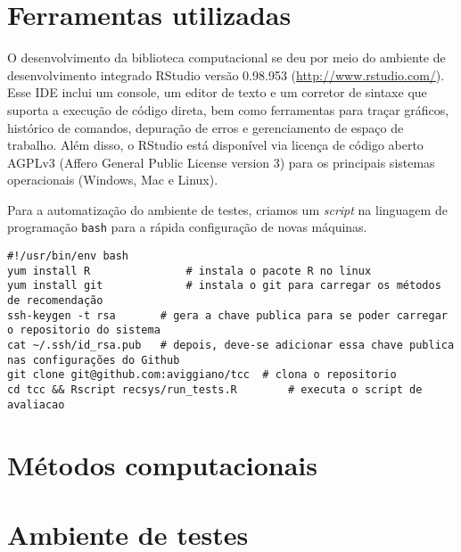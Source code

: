 \section{Ferramentas utilizadas} %
\label{sec:ferramentas_utilizadas}

O desenvolvimento da biblioteca computacional se deu por meio do ambiente de desenvolvimento integrado RStudio versão 0.98.953 (\url{http://www.rstudio.com/}). Esse IDE inclui um console, um editor de texto e um corretor de sintaxe que suporta a execução de código direta, bem como ferramentas para traçar gráficos, histórico de comandos, depuração de erros e gerenciamento de espaço de trabalho. Além disso, o RStudio está disponível via licença de código aberto AGPLv3 (Affero General Public License version 3) para os principais sistemas operacionais (Windows, Mac e Linux).

Para a automatização do ambiente de testes, criamos um \textit{script} na linguagem de programação \texttt{bash} para a rápida configuração de novas máquinas.

\begin{lstlisting}
#!/usr/bin/env bash
yum install R 				# instala o pacote R no linux
yum install git 			# instala o git para carregar os métodos de recomendação
ssh-keygen -t rsa 		# gera a chave publica para se poder carregar o repositorio do sistema
cat ~/.ssh/id_rsa.pub	# depois, deve-se adicionar essa chave publica nas configurações do Github
git clone git@github.com:aviggiano/tcc	# clona o repositorio
cd tcc && Rscript recsys/run_tests.R 		# executa o script de avaliacao
\end{lstlisting}



\section{Métodos computacionais} %
\label{sec:m_todos_computacionais}


\section{Ambiente de testes} %
\label{sec:ambiente_de_testes}

